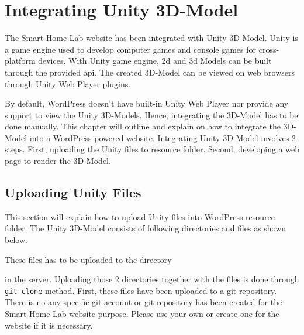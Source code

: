 \chapter{Integrating Unity 3D-Model} \label{sec:unity-integrating-unity-3d-model}

The Smart Home Lab website has been integrated with Unity 3D-Model. Unity is a game engine used to develop computer games and console games for cross-platform devices. With Unity game engine, \ac{2d} and \ac{3d} Models can be built through the provided \ac{api}. The created 3D-Model can be viewed on web browsers through Unity Web Player plugins.

By default, WordPress doesn't have built-in Unity Web Player nor provide any support to view the Unity 3D-Models. Hence, integrating the 3D-Model has to be done manually. This chapter will outline and explain on how to integrate the 3D-Model into a WordPress powered website. Integrating Unity 3D-Model involves 2 steps. First, uploading the Unity files to resource folder. Second, developing a web page to render the 3D-Model.

\section{Uploading Unity Files} \label{sec:unity-uploading-unity-files}
This section will explain how to upload Unity files into WordPress resource folder. The Unity 3D-Model consists of following directories and files as shown below. 
\newline


\bigskip

These files has to be uploaded to the directory \begin{quote}\end{quote} in the server. Uploading those 2 directories together with the files is done through \texttt{git clone} method. First, these files have been uploaded to a git repository. There is no any specific git account or git repository has been created for the Smart Home Lab website purpose. Please use your own or create one for the website if it is necessary.

